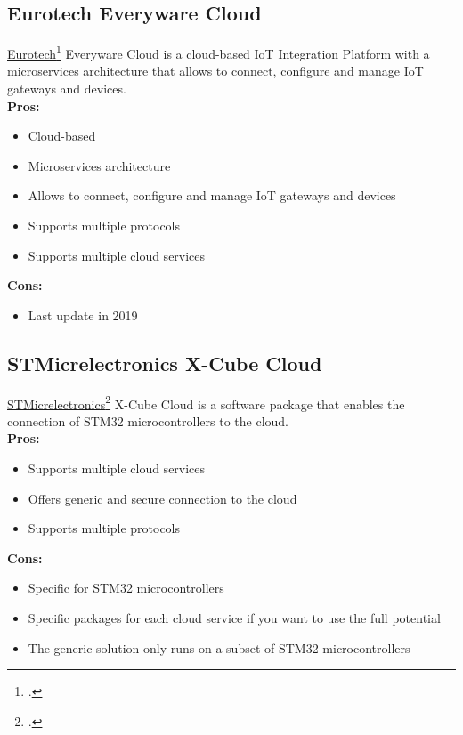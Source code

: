 \subsection{Eurotech Everyware Cloud}
\label{everyware-cloud}
\href{https://www.eurotech.com/}{Eurotech}\footcite{site:eurotech} Everyware Cloud is a cloud-based IoT Integration Platform with a microservices architecture that allows to connect, configure and manage IoT gateways and devices.\\
\textbf{Pros:}
\begin{itemize}
    \item Cloud-based
    \item Microservices architecture
    \item Allows to connect, configure and manage IoT gateways and devices
    \item Supports multiple protocols
    \item Supports multiple cloud services
\end{itemize}
\textbf{Cons:}
\begin{itemize}
    \item Last update in 2019
\end{itemize}

\subsection{STMicrelectronics X-Cube Cloud}
\label{stm}
\href{https://www.st.com/}{STMicrelectronics}\footcite{site:st-micro} X-Cube Cloud is a software package that enables the connection of STM32 microcontrollers to the cloud.\\
\textbf{Pros:}
\begin{itemize}
    \item Supports multiple cloud services
    \item Offers generic and secure connection to the cloud
    \item Supports multiple protocols
\end{itemize}
\textbf{Cons:}
\begin{itemize}
    \item Specific for STM32 microcontrollers
    \item Specific packages for each cloud service if you want to use the full potential
    \item The generic solution only runs on a subset of STM32 microcontrollers
\end{itemize}

